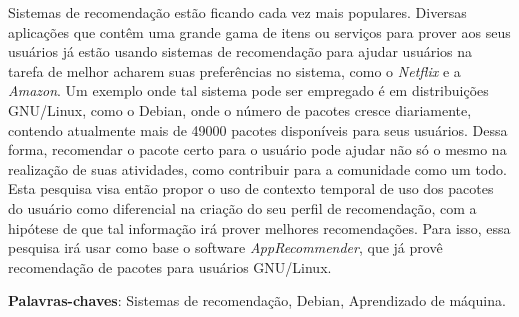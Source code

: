 \begin{resumo}

Sistemas de recomendação estão ficando cada vez mais populares. Diversas
aplicações que contêm uma grande gama de itens ou serviços para prover aos seus
usuários já estão usando sistemas de recomendação para ajudar usuários na
tarefa de melhor acharem suas preferências no sistema, como o \textit{Netflix} e
a \textit{Amazon}. Um exemplo onde tal sistema pode ser empregado é em
distribuições GNU/Linux, como
o Debian, onde o número de pacotes cresce diariamente,
contendo atualmente mais de 49000 pacotes disponíveis para seus usuários.
Dessa forma, recomendar o pacote certo para o usuário pode ajudar não só o mesmo
na realização de suas atividades, como contribuir para a comunidade como um todo.
Esta pesquisa visa então propor o uso de contexto temporal de uso dos pacotes do
usuário como diferencial na criação do seu perfil de recomendação, com a
hipótese de que tal informação irá prover melhores recomendações. Para isso,
essa pesquisa irá usar como base o software \textit{AppRecommender},
que já provê recomendação de pacotes para usuários GNU/Linux.


 \vspace{\onelineskip}
    
 \noindent
 \textbf{Palavras-chaves}: Sistemas de recomendação, Debian, Aprendizado de
 máquina.
\end{resumo}
